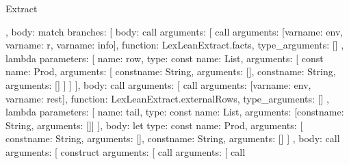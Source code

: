\begin{lexlean}{Extract}
\begin{toolingmodule}
{{{{          },
          {
            body: match{
              branches: [
                {
                  body: call{
                    arguments: [
                      call{
                        arguments: [var{name: env}, var{name: r}, var{name: info}],
                        function: LexLeanExtract.facts,
                        type_arguments: []
                      },
                      lambda{
                        parameters: [
                          {
                            name: row,
                            type: const{
                              name: List,
                              arguments: [
                                const{
                                  name: Prod,
                                  arguments: [
                                    const{name: String, arguments: []},
                                    const{name: String, arguments: []}
                                  ]
                                }
                              ]
                            }
                          }
                        ],
                        body: call{
                          arguments: [
                            call{
                              arguments: [var{name: env}, var{name: rest}],
                              function: LexLeanExtract.externalRows,
                              type_arguments: []
                            },
                            lambda{
                              parameters: [
                                {
                                  name: tail,
                                  type: const{
                                    name: List,
                                    arguments: [const{name: String, arguments: []}]
                                  }
                                }
                              ],
                              body: let{
                                type: const{
                                  name: Prod,
                                  arguments: [
                                    const{name: String, arguments: []},
                                    const{name: String, arguments: []}
                                  ]
                                },
                                body: call{
                                  arguments: [
                                    construct{
                                      arguments: [
                                        call{
                                          arguments: [
                                            call{
}}}}}}}}}}}}}}}
\end{toolingmodule}
\end{lexlean}

